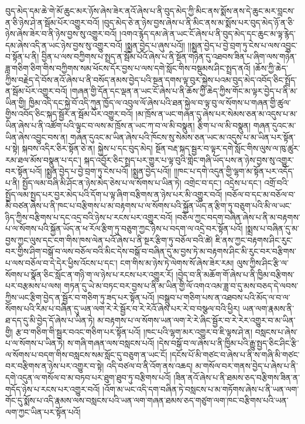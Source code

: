 བུད་མེད་དམ་ཆེ་གེ་མོ་ཆུང་མར་ཉོས་ཞེས་ཟེར་ནའོ་ཞེས་པ་ནི་བུད་མེད་ཀྱི་མིང་ནས་སྨོས་ནས་དེ་ཆུང་མར་བླངས་ན་ཅི་ཉེས་ཤེ་ན་སྦོམ་པོར་འགྱུར་བའོ། །བུད་མེད་ཅེ་ན་ཉེས་བྱས་ཞེས་པ་ནི་མིང་ནས་མ་སྨོས་པར་བུད་མེད་ཉོ་ན་ཅི་ཉེས་ཞེས་ཟེར་བ་ནི་ཉེས་བྱས་སུ་འགྱུར་བའོ། །འགའ་རྙེད་དམ་ཞེ་ན་ཡང་ངོ་ཞེས་པ་ནི་བུད་མེད་དང་ཆུང་མ་ལྟ་རྙེད་དམ་ཞེས་འདི་ན་ཡང་ཉེས་བྱས་སུ་འགྱུར་བའོ། །སྨྱན་བྱེད་པ་ཞུས་པའོ།། །།སྨྱན་བྱེད་པ་བྱེ་བྲག་ཏུ་ངེས་པ་ལས་འབྱུང་བ་སྟོན་པ་ནི། བྱིན་པ་ལས་བཀྱིགས་པ་སྤྲད་ན་སྦོམ་པོའོ་ཞེས་པ་ནི་སྔོན་གཉེན་དུ་འཐབས་ཟིན་པ་ཞིག་ལས་གཉེན་ཟླ་གཅིག་ཅིག་གིས་བཀྱིགས་སམ་ཕོངས་དོར་བྱས་པ་ལས་དགེ་སློང་གིས་བསྡུམས་ཤིང་སྤྲད་ནའོ། །ཆོས་ཀྱི་ཆེད་ཀྱིས་བརྗེད་དེ་བོས་ནའོ་ཞེས་པ་ནི་བསོད་ནམས་བྱེད་པའི་སྔན་དགས་ལྟ་བུར་སྐྱེས་པའམ་བུད་མེད་འབོད་ཅིང་སྤྲོད་ན་སྦོམ་པོར་འགྱུར་བའོ། །གཞན་གྱི་དོན་དང་ལྡན་ན་ཡང་ངོ་ཞེས་པ་ནི་ཆོས་ཀྱི་ཆེད་ཀྱིས་གོང་མ་ལྟར་བྱེད་པ་ནི་མ་ཡིན་གྱི། ཁྱིམ་འདི་དང་སྐྱེ་བོ་འདི་ཀུན་ཁྱོད་ལ་འབུལ་ལོ་ཞེས་པའི་ཐན་སྐྱེལ་བ་ལྟ་བུ་ལ་སོགས་པ་གཞན་གྱི་ཚུལ་གྱིས་འབོད་ཅིང་སྐད་སྦྱོར་ན་སྦོམ་པོར་འགྱུར་བའོ། །མ་ཁྲོས་ན་ཡང་གཞན་དུ་ཞེས་པར་སེམས་ཅན་མ་འདུས་པ་མ་ཡིན་ཞེས་པ་ནི་འཚོག་པའི་ལྟུང་བ་ལས་མ་ཁྲོས་ན་ཡང་ཀ་བ་ལ་མི་བསྣུན། རྩིག་པ་ལ་མི་བསྣུན། གཞན་དུའང་མ་ཡིན་ཞེས་འབྱུང་བས་ན། གཞན་དུའང་མ་ཡིན་ཞེས་པའི་ཁོངས་སུ་སེམས་ཅན་ཡང་མ་འདུས་པ་མ་ཡིན་པར་སྟོན་པ་སྟེ། སྐབས་འདིར་ཅིར་སྟོན་ཅེ་ན། སྐྱེས་པ་དང་བུད་མེད། སྔོན་བརྡ་སྐད་སྦྱར་བ་ལྟར་དགེ་སློང་གིས་ལུས་ལ་ཁུ་ཚུར་རམ་ཐལ་མོས་བསྣུན་པ་དང་། སྐད་འབྱོར་ཅིང་སྤྲད་པར་གྱུར་པ་ལྟ་བུའི་གླེང་གཞི་ཡོད་པས་ན་ཉེས་བྱས་སུ་འགྱུར་བར་སྟོན་པའོ། །སྨྱན་བྱེད་པ་བྱེ་བྲག་ཏུ་ངེས་པའོ། །སྨྱན་བྱེད་པའོ།། །།ཁང་པ་དགེ་འདུན་གྱི་ལྷག་མ་སྟོན་པར་འདོད་པ་ནི། སྤྱོད་ལམ་བཞི་མི་ཤོང་ན་ཉེས་མེད་ཅེས་པ་ལ་སོགས་པ་ཡིན་ཏེ། འགྲེང་བ་དང་། འདྲེས་པ་དང་། འགྲོ་བའི་སྤྱོད་ལམ་སྤྱད་པར་བྱར་མེད་པའི་དོག་པ་ལྟ་ཞིག་བརྩིགས་ན་ཉེས་པར་མི་འགྱུར་བའོ། །བཅོལ་བ་དང་མ་བཅོལ་བ་མི་བཙན་ཞེས་པ་ནི་ཁང་པ་བརྩིགས་པ་མ་བརྟགས་པ་ལ་སོགས་པའི་སྐྱོན་ཡོད་ན་རྩིག་ཏུ་བཅུག་པའི་མི་ལ་ཡང་ཉིད་ཀྱིས་བརྩིགས་པ་དང་འདྲ་བའི་ཉེས་པ་རངས་པར་འགྱུར་བའོ། །བཅོལ་ཀྱང་བདག་བཞིན་ཞེས་པ་ནི་མ་བརྟགས་པ་ལ་སོགས་པའི་སྐྱོན་ཡོད་ན་ཕ་རོལ་རྩིག་ཏུ་བཅུག་ཀྱང་ཉེས་པ་བདག་ལ་འདྲེ་བར་སྟོན་པའོ། །སྨྲས་པ་བཞིན་དུ་མ་བྱས་ཀྱང་ལུས་དང་ངག་གིས་ཁས་ལེན་པའོ་ཞེས་པ་ནི་སྔར་རྩིག་ཏུ་བཅོལ་བའི་ཚེ། ཇི་ནས་ཀྱང་བརྟགས་ཤིང་རུང་བར་གྱིས་ཤིག་བསྒོ་བ་ལས་བཅོལ་བའི་མིང་དེས་བསྒོ་བ་བཞིན་དུ་མ་བྱས་ཏེ་མ་བརྟགས་ཤིང་མི་རུང་བར་བརྩིགས་པ་ལས་བཅོལ་བ་དེ་དེར་ཕྱིས་འོངས་པ་དང་། ངག་གིས་མ་ཉེས་ཏེ་ལེགས་སོ་ཞེས་ཟེར་རམ། ལུས་ཀྱིས་ཤིང་རྩི་ལ་སོགས་པ་སྣོན་ཅིང་སློང་ན་གཉི་ག་ལ་ཉེས་པ་རངས་པར་འགྱུར་རོ། །བྱེད་བ་ནི་མཆོག་གོ་ཞེས་པ་ནི་ཁྱིམ་བརྩིགས་པར་བརྩམས་པ་ལས། གཏན་དུ་ཡེ་མ་བཏང་བར་བྱས་པ་ནི་མ་ཡིན་གྱི་ལོ་འགའ་འམ་ཟླ་བ་དུ་མས་བཅད་དེ་ལབས་ཀྱིས་ཡང་རྩིག་བྱེད་ན་སྦྱོར་བ་གཅིག་ཏུ་ཟད་པར་སྟོན་པའོ། །བསྒྲུབ་པ་གཅིག་པས་ན་འཐབས་པའི་མོད་ལ་བ་ལ་སོགས་པའི་རིམ་པ་བཞིན་དུ་ཡན་ལག་རེ་རེ་སྦྱོར་བ་རེ་རེའོ་ཞེས་པར་རེ་བ་བསྩལ་བའི་ཕྱིར། ཡན་ལག་རྣམས་ནི་ཐ་དད་དུ་མི་བྱེད་དོ་ཞེས་པ་ཡིན་ཏེ། མ་བརྟགས་པ་ལ་སོགས་ཡན་ལག་རེ་རེ་ཞིང་སྦྱོར་བ་རེ་རེར་འགྱུར་བ་མ་ཡིན་གྱི། རྩ་བ་གཅིག་གི་སྦྱར་བའང་གཅིག་པར་སྟོན་པའོ། །ཁང་པའི་ལྷག་མར་འགྱུར་བ་ཇི་ལྟས་ཤེ་ན། བསླངས་པ་ཞེས་པ་ལ་སོགས་པ་ཡིན་ཏེ། ས་གཞི་གཞན་ལས་བསླངས་པའོ། །དེས་བསྒོ་བ་ལ་ཞེས་པ་ནི་ཁྱིམ་པའི་རྒྱུ་སྤྱད་ཅིང་ཤིང་རྩི་ལ་སོགས་པ་བདག་གིས་བསླངས་སམ་སློང་དུ་བཅུག་ན་ཡང་ངོ། །དངོས་པོ་མི་གཙང་བ་ཞེས་པ་ནི་ས་གཞི་མི་གཙང་བར་བརྩིགས་ན་ཉེས་པར་འགྱུར་བ་སྟེ། འདི་བཙལ་བ་ནི་འོག་ནས་འཆད། མ་གསོལ་བར་གནས་བྱེད་པ་ཞེས་པ་ནི་དགེ་འདུན་ལ་གསོལ་བ་མ་བཏབ་པར་ཐུག་ཐུབ་ཏུ་བརྩིགས་པའོ། །ཟིན་ནའོ་ཞེས་པ་ནི་ཐམས་ཅད་བརྩིགས་ཟིན་ན་གདོད་ཉེས་པ་རངས་པར་འགྱུར་བའོ། །འོག་མ་ཡང་འདི་དག་བཞིན་ཏེ་བསླངས་པ་མ་གཏོགས་ཞེས་པ་ནི་ཡན་ལག་གོང་དུ་སྨོས་པ་འདི་རྣམས་ལས་བསླངས་པའི་ཡན་ལག་གཞན་ཐམས་ཅད་གཙུག་ལག་ཁང་བརྩིགས་པའི་ཡན་ལག་ཀྱང་ཡིན་པར་སྟོན་པའོ། 